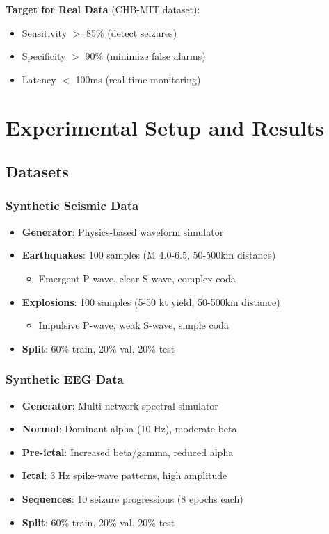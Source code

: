 \documentclass[11pt]{article}
\theoremstyle{remark}
\begin{document}
\textbf{Target for Real Data} (CHB-MIT dataset):
\begin{itemize}
\item Sensitivity $>$ 85\% (detect seizures)
\item Specificity $>$ 90\% (minimize false alarms)
\item Latency $<$ 100ms (real-time monitoring)
\end{itemize}

\section{Experimental Setup and Results}

\subsection{Datasets}

\subsubsection{Synthetic Seismic Data}
\begin{itemize}
\item \textbf{Generator}: Physics-based waveform simulator
\item \textbf{Earthquakes}: 100 samples (M 4.0-6.5, 50-500km distance)
\begin{itemize}
\item Emergent P-wave, clear S-wave, complex coda
\end{itemize}
\item \textbf{Explosions}: 100 samples (5-50 kt yield, 50-500km distance)
\begin{itemize}
\item Impulsive P-wave, weak S-wave, simple coda
\end{itemize}
\item \textbf{Split}: 60\% train, 20\% val, 20\% test
\end{itemize}

\subsubsection{Synthetic EEG Data}
\begin{itemize}
\item \textbf{Generator}: Multi-network spectral simulator
\item \textbf{Normal}: Dominant alpha (10 Hz), moderate beta
\item \textbf{Pre-ictal}: Increased beta/gamma, reduced alpha
\item \textbf{Ictal}: 3 Hz spike-wave patterns, high amplitude
\item \textbf{Sequences}: 10 seizure progressions (8 epochs each)
\item \textbf{Split}: 60\% train, 20\% val, 20\% test
\end{itemize}
\end{document}
